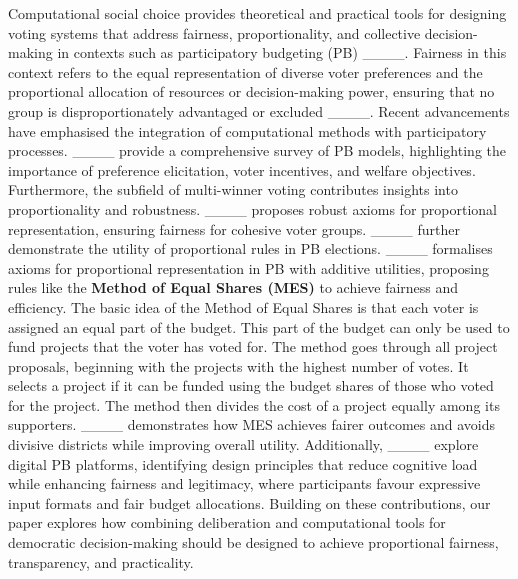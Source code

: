 Computational social choice provides theoretical and practical tools for designing voting systems that address fairness, proportionality, and collective decision-making in contexts such as participatory budgeting (PB) ____. Fairness in this context refers to the equal representation of diverse voter preferences and the proportional allocation of resources or decision-making power, ensuring that no group is disproportionately advantaged or excluded ____. Recent advancements have emphasised the integration of computational methods with participatory processes. ____ provide a comprehensive survey of PB models, highlighting the importance of preference elicitation, voter incentives, and welfare objectives. Furthermore, the subfield of multi-winner voting contributes insights into proportionality and robustness. ____ proposes robust axioms for proportional representation, ensuring fairness for cohesive voter groups. ____ further demonstrate the utility of proportional rules in PB elections. ____ formalises axioms for proportional representation in PB with additive utilities, proposing rules like the \textbf{Method of Equal Shares (MES)} to achieve fairness and efficiency. The basic idea of the Method of Equal Shares is that each voter is assigned an equal part of the budget. This part of the budget can only be used to fund projects that the voter has voted for. The method goes through all project proposals, beginning with the projects with the highest number of votes. It selects a project if it can be funded using the budget shares of those who voted for the project. The method then divides the cost of a project equally among its supporters. ____ demonstrates how MES achieves fairer outcomes and avoids divisive districts while improving overall utility. Additionally, ____ explore digital PB platforms, identifying design principles that reduce cognitive load while enhancing fairness and legitimacy, where participants favour expressive input formats and fair budget allocations. Building on these contributions, our paper explores how combining deliberation and computational tools for democratic decision-making should be designed to achieve proportional fairness, transparency, and practicality.